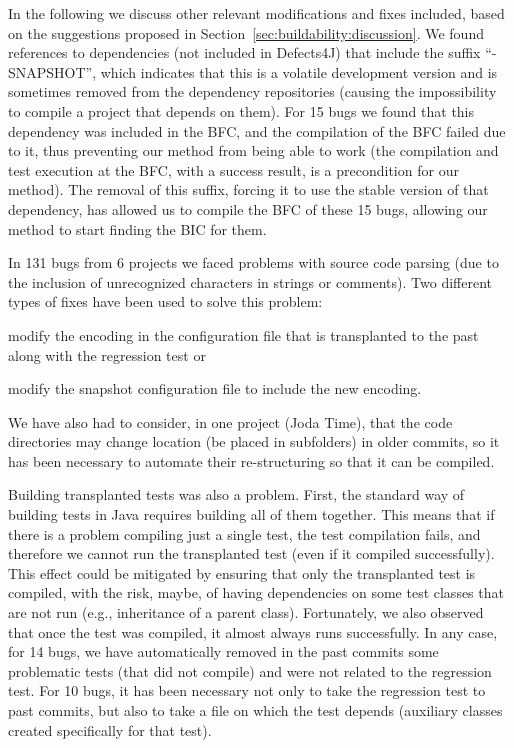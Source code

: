In the following we discuss other relevant modifications and fixes included, based on the suggestions proposed in Section~\ref{sec:buildability:discussion}.
We found references to dependencies (not included in Defects4J) that include the suffix ``-SNAPSHOT'', which indicates that this is a volatile development version and is sometimes removed from the dependency repositories (causing the impossibility to compile a project that depends on them). 
For 15 bugs we found that this dependency was included in the BFC, and the compilation of the BFC failed due to it, thus preventing our method from being able to work (the compilation and test execution at the BFC, with a success result, is a precondition for our method). 
The removal of this suffix, forcing it to use the stable version of that dependency, has allowed us to compile the BFC of these 15 bugs, allowing our method to start finding the BIC for them.

In 131 bugs from 6 projects we faced problems with source code parsing (due to the inclusion of unrecognized characters in strings or comments). 
Two different types of fixes have been used to solve this problem: 
\begin{inparaenum}[\bf(1)]
    \item modify the encoding in the configuration file that is transplanted to the past along with the regression test or
    \item modify the snapshot configuration file to include the new encoding.
\end{inparaenum} 
We have also had to consider, in one project (Joda Time), that the code directories may change location (be placed in subfolders) in older commits, so it has been necessary to automate their re-structuring so that it can be compiled.

Building transplanted tests was also a problem. First, the standard way of building tests in Java requires building all of them together. 
This means that if there is a problem compiling just a single test, the test compilation fails, and therefore we cannot run the transplanted test (even if it compiled successfully).
This effect could be mitigated by ensuring that only the transplanted test is compiled, with the risk, maybe, of having dependencies on some test classes that are not run (e.g., inheritance of a parent class). Fortunately, we also observed that once the test was compiled, it almost always runs successfully.
In any case, for 14 bugs, we have automatically removed in the past commits some problematic tests (that did not compile) and were not related to the regression test.
For 10 bugs, it has been necessary not only to take the regression test to past commits, but also to take a file on which the test depends (auxiliary classes created specifically for that test).

